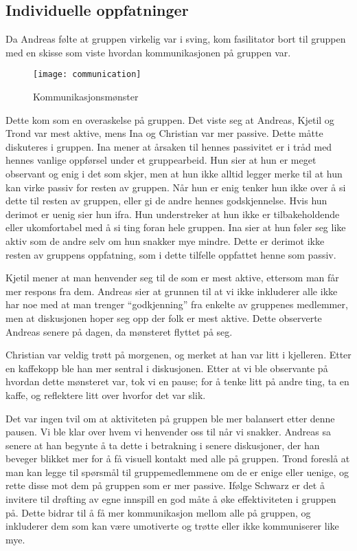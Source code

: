 \subsection{Individuelle oppfatninger}
Da Andreas følte at gruppen virkelig var i sving, kom fasilitator bort
til gruppen med en skisse som viste hvordan kommunikasjonen på gruppen
var.
\begin{figure}
\begin{center}
\texttt{[image: communication]}
\caption{Kommunikasjonsmønster}
\end{center}
\end{figure}
Dette kom som en overaskelse på gruppen. Det viste seg at Andreas,
Kjetil og Trond var mest aktive, mens Ina og Christian var mer passive.
Dette måtte diskuteres i gruppen.  Ina mener at årsaken til hennes
passivitet er i tråd med hennes vanlige oppførsel under et gruppearbeid.
Hun sier at hun er meget observant og enig i det som skjer, men at hun
ikke alltid legger merke til at hun kan virke passiv for resten av
gruppen. Når hun er enig tenker hun ikke over å si dette til resten av
gruppen, eller gi de andre hennes godskjennelse. Hvis hun derimot er
uenig sier hun ifra. Hun understreker at hun ikke er tilbakeholdende
eller ukomfortabel med å si ting foran hele gruppen. Ina sier at hun
føler seg like aktiv som de andre selv om hun snakker mye mindre. Dette
er derimot ikke resten av gruppens oppfatning, som i dette tilfelle
oppfattet henne som passiv. 

Kjetil mener at man henvender seg til de som er mest aktive, ettersom
man får mer respons fra dem. Andreas sier at grunnen til at vi ikke
inkluderer alle ikke har noe med at man trenger “godkjenning” fra
enkelte av gruppenes medlemmer, men at diskusjonen hoper seg opp der
folk er mest aktive. Dette observerte Andreas senere på dagen, da
mønsteret flyttet på seg. 

Christian var veldig trøtt på morgenen, og merket at han var litt i
kjelleren. Etter en kaffekopp ble han mer sentral i diskusjonen. Etter
at vi ble observante på hvordan dette mønsteret var, tok vi en pause;
for å tenke litt på andre ting, ta en kaffe, og reflektere litt over
hvorfor det var slik. 

Det var ingen tvil om at aktiviteten på gruppen ble mer balansert etter
denne pausen. Vi ble klar over hvem vi henvender oss til når vi snakker.
Andreas sa senere at han begynte å ta dette i betrakning i senere
diskusjoner, der han beveger blikket mer for å få visuell kontakt med
alle på gruppen. Trond foreslå at man kan legge til spørsmål til
gruppemedlemmene om de er enige eller uenige, og rette disse mot dem på
gruppen som er mer passive. Ifølge Schwarz \cite{Schwarz} er det å
invitere til drøfting av egne innspill en god måte å øke effektiviteten
i gruppen på. Dette bidrar til å få mer kommunikasjon mellom alle på
gruppen, og inkluderer dem som kan være umotiverte og trøtte eller ikke
kommuniserer like mye. 

